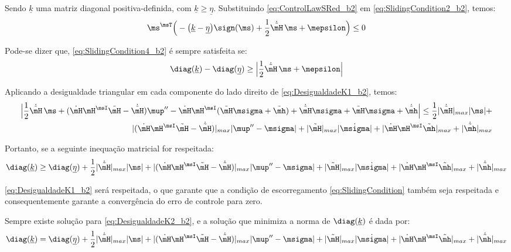\documentclass[]{politex}
\begin{document}
\begin{itemize}
\begin{itemize}
Sendo $\underline{k}$ uma matriz diagonal positiva-definida, com $\underline{k} \geq \underline{\eta} $. Substituindo \eqref{eq:ControlLawSRed_b2} em \eqref{eq:SlidingCondition2_b2}, temos:
\begin{equation} \label{eq:SlidingCondition4_b2}
\ms^\msT \Big(- \big(\underline{k} - \underline{\eta} \big)  \sign(\ms) + \frac{1}{2} \dot{\tilde{\mH}} \, \ms + \mepsilon  \Big) \leq 0
\end{equation}

Pode-se dizer que, \eqref{eq:SlidingCondition4_b2} \'e sempre satisfeita se:
\begin{equation} \label{eq:DesigualdadeK1_b2}
 \diag(\underline{k}) - \diag(\underline{\eta}) \geq  \Big| \frac{1}{2} \dot{\tilde{\mH}} \, \ms + \mepsilon \Big|
\end{equation}

Aplicando a desigualdade triangular em cada componente do lado direito de \eqref{eq:DesigualdadeK1_b2}, temos:
\begin{equation}
\begin{split}
\Big| \frac{1}{2} \dot{\tilde{\mH}} \, \ms + ( \dot{\mH} \mH^\msI \tilde{\mH} -\dot{\tilde{\mH}}) \mup'' -  \dot{\mH} \mH^\msI ( \tilde{\mH}\msigma + \tilde{\mh} ) +  \dot{\tilde{\mH}}\msigma + \tilde{\mH} {\msigma} + \dot{\tilde{\mh}} \Big| \leq  \frac{1}{2}|\dot{\tilde{\mH}}|_{max} |\ms| + \\
 |( \dot{\mH} \mH^\msI \tilde{\mH} -\dot{\tilde{\mH}})|_{max} 	|\mup'' - \msigma | + |\tilde{\mH}|_{max} |\dot{\msigma}| + |\dot{\mH} \mH^\msI \tilde{\mh}|_{max} + |\dot{\tilde{\mh}}|_{max}
\end{split}
\end{equation}

Portanto, se a seguinte inequa\c{c}\~ao matricial for respeitada:
\begin{equation} \label{eq:DesigualdadeK2_b2}
\diag(\underline{k})  \geq \diag(\underline{\eta}) + \frac{1}{2}|\dot{\tilde{\mH}}|_{max} |\ms| + |( \dot{\mH} \mH^\msI \tilde{\mH} -\dot{\tilde{\mH}})|_{max} 	|\mup'' - \msigma | + |\tilde{\mH}|_{max} |\dot{\msigma}| + |\dot{\mH} \mH^\msI \tilde{\mh}|_{max} + |\dot{\tilde{\mh}}|_{max}
\end{equation}

\eqref{eq:DesigualdadeK1_b2} ser\'a respeitada, o que garante que a condi\c{c}\~ao de escorregamento \eqref{eq:SlidingCondition} tamb\'em seja respeitada e consequentemente garante a converg\^encia do erro de controle para zero.

Sempre existe solu\c{c}\~ao para \eqref{eq:DesigualdadeK2_b2}, e a solução que minimiza a norma de $\diag(\underline{k})$ é dada por:
\begin{equation} \label{eq:MatrizDiagk_b2}
\diag(\underline{k})  = \diag(\underline{\eta}) + \frac{1}{2}|\dot{\tilde{\mH}}|_{max} |\ms| + |( \dot{\mH} \mH^\msI \tilde{\mH} -\dot{\tilde{\mH}})|_{max} 	|\mup'' - \msigma | + |\tilde{\mH}|_{max} |\dot{\msigma}| + |\dot{\mH} \mH^\msI \tilde{\mh}|_{max} + |\dot{\tilde{\mh}}|_{max}
\end{equation}


\end{itemize}
\end{itemize}
\end{document}
